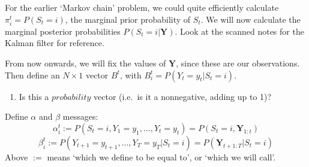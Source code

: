 \documentclass[]{article}
\providecommand{\tightlist}{%
  \setlength{\itemsep}{0pt}\setlength{\parskip}{0pt}}
\begin{document}
For the earlier `Markov chain' problem, we could quite efficiently
calculate \(\pi_i^t = P(S_t = i)\), the marginal prior probability of
\(S_t\). We will now calculate the marginal posterior probabilities
\(P(S_t = i|\mathbf{Y})\). Look at the scanned notes for the Kalman
filter for reference.

From now onwards, we will fix the values of \(\mathbf{Y}\), since these
are our observations. Then define an \(N \times 1\) vector \(B^t\), with
\(B^t_i = P(Y_t = y_t|S_t = i)\).

\begin{enumerate}
\def\labelenumi{\arabic{enumi}.}
\tightlist
\item
  Is this a \(probability\) vector (i.e.~is it a nonnegative, adding up
  to 1)?
\end{enumerate}

Define \(\alpha\) and \(\beta\) messages:
\[\alpha_i^t := P(S_t = i, Y_1 = y_1, \dots, Y_t = y_t) = P(S_t = i, \mathbf{Y}_{1:t})\]
\[\beta_i^t := P(Y_{t+1} = y_{t+1}, \dots, Y_T = y_T | S_t = i) = P(\mathbf{Y}_{t+1:T} | S_t = i)\]
Above \(:=\) means `which we define to be equal to', or `which we will
call'.
\end{document}
